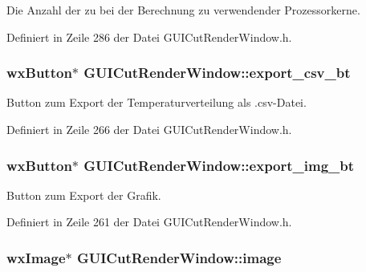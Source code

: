 Die Anzahl der zu bei der Berechnung zu verwendender Prozessorkerne. 



Definiert in Zeile 286 der Datei G\-U\-I\-Cut\-Render\-Window.\-h.

\hypertarget{classGUICutRenderWindow_a1613155eefe8309903858f9427b263de}{
\subsubsection[{export\-\_\-csv\-\_\-bt}]{\setlength{\rightskip}{0pt plus 5cm}wx\-Button$\ast$ G\-U\-I\-Cut\-Render\-Window\-::export\-\_\-csv\-\_\-bt\hspace{0.3cm}{\ttfamily [private]}}}\label{classGUICutRenderWindow_a1613155eefe8309903858f9427b263de}


Button zum Export der Temperaturverteilung als .csv-\/\-Datei. 



Definiert in Zeile 266 der Datei G\-U\-I\-Cut\-Render\-Window.\-h.

\hypertarget{classGUICutRenderWindow_ac0b26b746d6339154256d81da8cd7aed}{
\subsubsection[{export\-\_\-img\-\_\-bt}]{\setlength{\rightskip}{0pt plus 5cm}wx\-Button$\ast$ G\-U\-I\-Cut\-Render\-Window\-::export\-\_\-img\-\_\-bt\hspace{0.3cm}{\ttfamily [private]}}}\label{classGUICutRenderWindow_ac0b26b746d6339154256d81da8cd7aed}


Button zum Export der Grafik. 



Definiert in Zeile 261 der Datei G\-U\-I\-Cut\-Render\-Window.\-h.

\hypertarget{classGUICutRenderWindow_a30c36db74a83fc5523407d3611c1db34}{
\subsubsection[{image}]{\setlength{\rightskip}{0pt plus 5cm}wx\-Image$\ast$ G\-U\-I\-Cut\-Render\-Window\-::image\hspace{0.3cm}{\ttfamily [private]}}}\label{classGUICutRenderWindow_a30c36db74a83fc5523407d3611c1db34}


